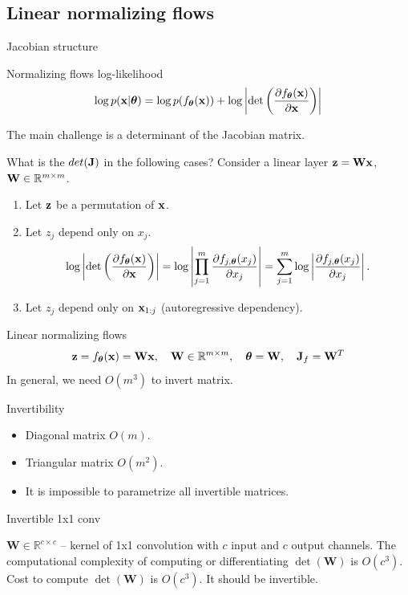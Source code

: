\subsection{Linear normalizing flows}
\begin{frame}{Jacobian structure}
	\begin{block}{Normalizing flows log-likelihood}
		\[
			\log p(\mathbf{x}|\boldsymbol{\theta}) = \log p(f_{\boldsymbol{\theta}}(\mathbf{x})) + \log \left|\det \left( \frac{\partial f_{\boldsymbol{\theta}}(\mathbf{x})}{\partial \mathbf{x}} \right) \right|
		\]
	\end{block}
	The main challenge is a determinant of the Jacobian matrix.
	\begin{block}{What is the $det(\mathbf{J})$ in the following cases?}
		Consider a linear layer $\mathbf{z} = \mathbf{W} \mathbf{x}$, $\mathbf{W} \in \mathbb{R}^{m \times m}$.
		\begin{enumerate}
			\item Let $\mathbf{z}$ be a permutation of $\mathbf{x}$. 
			\item Let $z_j$ depend only on $x_j$. 
			\[
				\log \left|\det \left( \frac{\partial f_{\boldsymbol{\theta}}(\mathbf{x})}{\partial \mathbf{x}} \right) \right| = \log \left| \prod_{j=1}^m \frac{\partial f_{j, \boldsymbol{\theta}}(x_j)}{\partial x_j} \right| = \sum_{j=1}^m \log \left|  \frac{\partial f_{j, \boldsymbol{\theta}}(x_j)}{\partial x_j} \right|.
			\]
			\item Let $z_j$ depend only on $\mathbf{x}_{1:j}$ (autoregressive dependency). 
		\end{enumerate}
	\end{block}
\end{frame}
\begin{frame}{Linear normalizing flows}
	\[
		\mathbf{z} = f_{\boldsymbol{\theta}}(\mathbf{x}) = \mathbf{W} \mathbf{x}, \quad \mathbf{W} \in \mathbb{R}^{m \times m}, \quad \boldsymbol{\theta} = \mathbf{W}, \quad \mathbf{J}_f = \mathbf{W}^T
	\]
	In general, we need $O(m^3)$ to invert matrix.
	\begin{block}{Invertibility}
		\begin{itemize}
			\item Diagonal matrix $O(m)$.
			\item Triangular matrix $O(m^2)$.
			\item It is impossible to parametrize all invertible matrices.
		\end{itemize}
	\end{block}
	\begin{block}{Invertible 1x1 conv}
			
		$\mathbf{W} \in \mathbb{R}^{c \times c}$ -- kernel of 1x1 convolution with $c$ input and $c$ output channels.
		The computational complexity of computing or differentiating $\det (\mathbf{W})$ is $O(c^3)$.
		Cost to compute $\det (\mathbf{W})$ is $O(c^3)$. It should be invertible.
	\end{block}
	
\end{frame}
